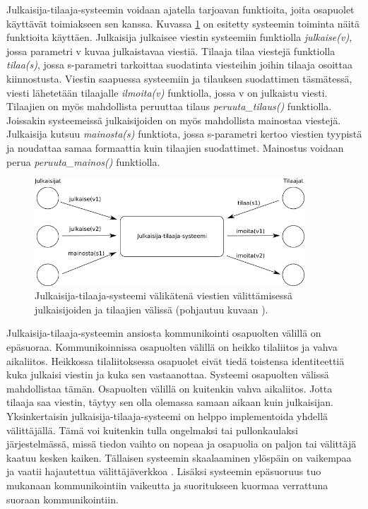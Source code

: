 Julkaisija-tilaaja-systeemin voidaan ajatella tarjoavan funktioita, joita osapuolet käyttävät toimiakseen sen kanssa. Kuvassa \ref{fig:publish-subscribe-communication} on esitetty systeemin toiminta näitä funktioita käyttäen. Julkaisija julkaisee viestin systeemiin funktiolla \emph{julkaise(v)}, jossa parametri v kuvaa julkaistavaa viestiä. Tilaaja tilaa viestejä funktiolla \emph{tilaa(s)}, jossa s-parametri tarkoittaa suodatinta viesteihin joihin tilaaja osoittaa kiinnostusta. Viestin saapuessa systeemiin ja tilauksen suodattimen täsmätessä, viesti lähetetään tilaajalle \emph{ilmoita(v)} funktiolla, jossa v on julkaistu viesti. Tilaajien on myös mahdollista peruuttaa tilaus \emph{peruuta\_tilaus()} funktiolla. Joissakin systeemeissä julkaisijoiden on myös mahdollista mainostaa viestejä. Julkaisija kutsuu \emph{mainosta(s)} funktiota, jossa s-parametri kertoo viestien tyypistä ja noudattaa samaa formaattia kuin tilaajien suodattimet. Mainostus voidaan perua \emph{peruuta\_mainos()} funktiolla. \mbox{\cite[s.~2--3]{baldoni2005distributed}} \mbox{\cite[s.~26--28]{distributed-event-based-systems}}

\begin{figure}[ht!]
	\includegraphics[width=0.9\textwidth]{pictures/publish-subscribe.png}
	\caption{Julkaisija-tilaaja-systeemi välikätenä viestien välittämisessä julkaisijoiden ja tilaajien välissä (pohjautuu kuvaan \mbox{\cite[s.~246]{distributed-systems-concepts-and-design}}).}
	\label{fig:publish-subscribe-communication}
\end{figure}

Julkaisija-tilaaja-systeemin ansiosta kommunikointi osapuolten välillä on epäsuoraa. Kommunikoinnissa osapuolten välillä on heikko tilaliitos ja vahva aikaliitos. Heikkossa tilaliitoksessa osapuolet eivät tiedä toistensa identiteettiä kuka julkaisi viestin ja kuka sen vastaanottaa. Systeemi osapuolten välissä mahdollistaa tämän. Osapuolten välillä on kuitenkin vahva aikaliitos. Jotta tilaaja saa viestin, täytyy sen olla olemassa samaan aikaan kuin julkaisijan. Yksinkertaisin julkaisija-tilaaja-systeemi on helppo implementoida yhdellä välittäjällä. Tämä voi kuitenkin tulla ongelmaksi tai pullonkaulaksi järjestelmässä, missä tiedon vaihto on nopeaa ja osapuolia on paljon tai välittäjä kaatuu kesken kaiken. Tällaisen systeemin skaalaaminen ylöspäin on vaikempaa ja vaatii hajautettua välittäjäverkkoa \cite[s.~248--249]{distributed-systems-concepts-and-design}. Lisäksi systeemin epäsuoruus tuo mukanaan kommunikointiin vaikeutta ja suoritukseen kuormaa verrattuna suoraan kommunikointiin.


